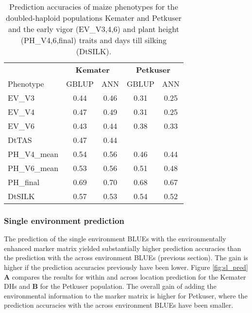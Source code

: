\onehalfspacing
\begin{table}[H]
  \caption[Prediction accuracies of maize phenotypes for GBLUP and ANN]{Prediction
    accuracies of maize phenotypes for the doubled-haploid populations Kemater and
    Petkuser and the early vigor (EV\_V3,4,6) and plant height (PH\_V4,6,final) traits and
    days till silking (DtSILK).}
  \centering
  \begin{tabular}{lcc|cc}
  \toprule
  & \multicolumn{2}{c}{\textbf{Kemater}} & \multicolumn{2}{c}{\textbf{Petkuser}} \\
  Phenotype    & GBLUP                                & ANN  & GBLUP & ANN                    \\ 
  \midrule
  EV\_V3       & 0.44                                 & 0.46 & 0.31  & 0.25                   \\ 
  EV\_V4       & 0.47                                 & 0.49 & 0.31  & 0.25                   \\ 
  EV\_V6       & 0.43                                 & 0.44 & 0.38  & 0.33                   \\ 
  DtTAS        & 0.47                                 & 0.44 &       &                        \\ 
  PH\_V4\_mean & 0.54                                 & 0.56 & 0.46  & 0.44                   \\ 
  PH\_V6\_mean & 0.53                                 & 0.56 & 0.51  & 0.48                   \\ 
  PH\_final    & 0.69                                 & 0.70 & 0.68  & 0.67                   \\ 
  DtSILK       & 0.57                                 & 0.53 & 0.54  & 0.52                   \\ 
  \bottomrule
\end{tabular}
\end{table}
\doublespacing

\subsubsection{Single environment prediction}

The prediction of the single environment BLUEs with the environmentally enhanced marker
matrix yielded substantially higher prediction accuracies than the prediction with the
across environment BLUEs (previous section). The gain is higher if the prediction
accuracies previously have been lower. Figure \ref{fig:sl_pred} \textbf{A} compares the
results for within and across location prediction for the Kemater DHs and \textbf{B} for
the Petkuser population. The overall gain of adding the environmental information to the
marker matrix is higher for Petkuser, where the prediction accuracies with the across
environment BLUEs have been smaller.

